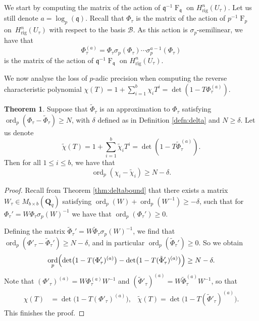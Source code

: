 \documentclass[a4paper,11pt]{article}
\numberwithin{equation}{section}
\newcommand{\QQ}{\mathbf{Q}} %
\DeclareMathOperator{\ord}{ord}          %
\DeclareMathOperator{\Frob}{F}           %
\providecommand{\Hrig}{H_{\text{rig}}}  %
\providecommand{\cB}{\mathcal{B}} %
\theoremstyle{definition}
\newtheorem{thm}{Theorem}[section]
\begin{document}
We start by computing the matrix of the action of $\mathfrak{q}^{-1} \Frob_{\mathfrak{q}}$ on $\Hrig^n(U_{\tau})$.
Let us still denote $a=\log_p(\mathfrak{q})$. Recall that $\Phi_{\tau}$ is the matrix of the action 
of $p^{-1} \Frob_p$ on~$\Hrig^{n}(U_{\tau})$ with respect to the basis $\cB$. As this action is 
$\sigma_p$-semilinear, we have that 
\begin{equation*}
\Phi_{\tau}^{(a)} = 
    \Phi_{\tau} \sigma_p(\Phi_{\tau}) \dotsm \sigma_p^{a-1}(\Phi_{\tau})
\end{equation*}
is the matrix of the action of $\mathfrak{q}^{-1} \Frob_{\mathfrak{q}}$ on $\Hrig^n(U_{\tau})$. 

We now analyse the loss of $p$-adic precision when computing the reverse characteristic polynomial 
$\chi(T)=1+\sum_{i=1}^b \chi_i T^i=\det( 1 - T \Phi_{\tau}^{(a)})$.  

\begin{thm} \label{thm:preccharpoly}
Suppose that $\tilde{\Phi}_{\tau}$ is an approximation to 
$\Phi_{\tau}$ satisfying
$\ord_p (\Phi_{\tau}-\tilde{\Phi}_{\tau}) \geq N$,
with $\delta$ defined as in Definition \ref{defn:delta} and $N \geq \delta$. Let us denote
\[
\tilde{\chi}(T)=1+\sum_{i=1}^b \tilde{\chi}_i T^i = \det( 1 - T \tilde{\Phi}_{\tau}^{(a)}).
\]
Then for all $1 \leq i \leq b$, we have that 
\[
\ord_p (\chi_i - \tilde{\chi}_i) \geq N-\delta.
\]
\end{thm}

\begin{proof} 
Recall from Theorem \ref{thm:deltabound} that there exists a matrix $W_{\tau} \in M_{b \times b}(\QQ_q)$
satisfying $\ord_p(W)+\ord_p(W^{-1}) \geq -\delta$, such that for $\Phi_{\tau}'=W \Phi_{\tau} \sigma_p(W)^{-1}$ 
we have that $\ord_p(\Phi_{\tau}') \geq 0$. 

Defining the matrix $\tilde{\Phi}_{\tau}'=W \tilde{\Phi}_{\tau} \sigma_p(W)^{-1}$,
we find that $\ord_p(\Phi'_{\tau}-\tilde{\Phi}_{\tau}') \geq N-\delta$, and in particular
$\ord_p(\tilde{\Phi}_{\tau}') \geq 0$. So we obtain
\[
\ord_p \Bigl( \det\bigl(1 - T (\Phi'_{\tau})^{(a)}\bigr) 
            - \det\bigl(1 - T (\tilde{\Phi}'_{\tau})^{(a)}\bigr) \Bigr) \geq N-\delta.
\] 
Note that $(\Phi'_{\tau})^{(a)}= W \Phi_{\tau}^{(a)} W^{-1}$
and $(\tilde{\Phi}'_{\tau})^{(a)}= W \tilde{\Phi}_{\tau}^{(a)} W^{-1}$, so that
\begin{align*}
\chi(T)&=\det\bigl(1 - T (\Phi'_{\tau})^{(a)}\bigr), \; \; \; 
\tilde{\chi}(T)=\det\bigl(1 - T (\tilde{\Phi}'_{\tau})^{(a)}\bigr).
\end{align*}
This finishes the proof.
\end{proof}
\end{document}
